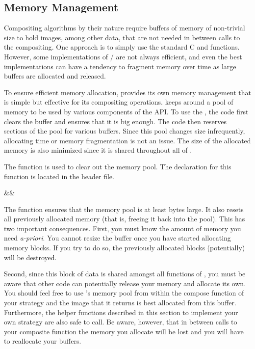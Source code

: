 \subsection{Memory Management}

Compositing algorithms by their nature require buffers of memory of
non-trivial size to hold images, among other data, that are not needed in
between calls to the compositing.  One approach is to simply use the
standard C  and  functions.
However, some implementations of
/ are not always efficient, and
even the best implementations can have a tendency to fragment memory over
time as large buffers are allocated and released.

To ensure efficient memory allocation, \IceT provides its own memory
management that is simple but effective for its compositing operations.
\IceT keeps around a pool of memory to be used by various components of the
API.  To use the , the code first clears the buffer and ensures that it is big
enough.  The code then reserves sections of the pool for various buffers.
Since this pool changes size infrequently, allocating time or memory
fragmentation is not an issue.  The size of the allocated memory is also
minimized since it is shared throughout all of \IceT.

\label{manpage:icetResizeBuffer}
The  function is used to clear out the memory
pool.  The declaration for this function is located in the
 header file.

\begin{Table}{3}
  \textC{(}&&\quad\textC{);}
\end{Table}

The  function ensures that the memory pool is at
least  bytes large.  It also resets all previously allocated
memory (that is, freeing it back into the pool).  This has two important
consequences.  First, you must know the amount of memory you need
\emph{a-priori}.  You cannot resize the buffer once you have started
allocating memory blocks.  If you try to do so, the previously allocated
blocks (potentially) will be destroyed.

Second, since this block of data is shared amongst all functions of \IceT,
you must be aware that other \IceT code can potentially release your memory
and allocate its own.  You should feel free to use \IceT's memory pool from
within the compose function of your strategy and the image that it returns
is best allocated from this buffer.  Furthermore, the helper functions
described in this section to implement your own strategy are also safe to
call.  Be aware, however, that in between calls to your composite function
the memory you allocate will be lost and you will have to reallocate your
buffers.

